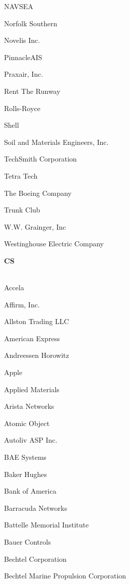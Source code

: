 \documentclass[twoside]{article}
\begin{document}
\begin{center}
\begin{multicols}{5}
\begin{FlushLeft}
\begin{compactitem}
\item NAVSEA
\item Norfolk Southern
\item Novelis Inc.
\item PinnacleAIS
\item Praxair, Inc.
\item Rent The Runway
\item Rolls-Royce
\item Shell
\item Soil and Materials Engineers, Inc.
\item TechSmith Corporation
\item Tetra Tech
\item The Boeing Company
\item Trunk Club
\item W.W. Grainger, Inc
\item Westinghouse Electric Company
\end{compactitem}
        \end{FlushLeft}
        \vspace{1em}
        {\fontsize{14}{16}\selectfont \bf CS}\\
        \vspace{-1em}
        ~\hrulefill~
        \vspace{-.9em}
        \begin{FlushLeft}
        \begin{compactitem}
        \item Accela
\item Affirm, Inc.
\item Allston Trading LLC
\item American Express
\item Andreessen Horowitz
\item Apple
\item Applied Materials
\item Arista Networks
\item Atomic Object
\item Autoliv ASP Inc.
\item BAE Systems
\item Baker Hughes
\item Bank of America
\item Barracuda Networks
\item Battelle Memorial Institute
\item Bauer Controls
\item Bechtel Corporation
\item Bechtel Marine Propulsion Corporation

\end{compactitem}
\end{FlushLeft}
\end{multicols}
\end{center}
\end{document}
